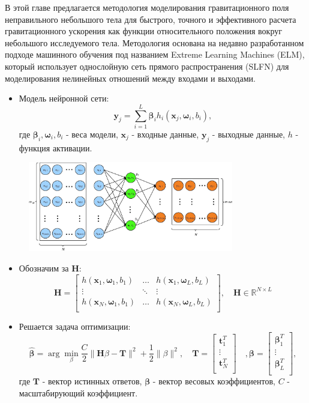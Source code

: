 В этой главе предлагается методология моделирования гравитационного поля неправильного небольшого тела для быстрого, точного и эффективного расчета гравитационного ускорения как функции относительного положения вокруг небольшого исследуемого тела.
Методология основана на недавно разработанном подходе машинного обучения под названием Extreme Learning Machines (ELM), который использует однослойную сеть прямого распространения (SLFN) для моделирования нелинейных отношений между входами и выходами.
\begin{itemize}
\item Модель нейронной сети:
\[
    \mathbf{y}_j = \sum_{i=1}^L \mathbf{\beta}_i
        h_i(\mathbf{x}_j,\mathbf{\omega}_i,{b}_i),
\]
где $\mathbf{\beta}_i,\mathbf{\omega}_i,{b}_i$ - веса модели, $\mathbf{x}_j$ - входные данные, $\mathbf{y}_j$ - выходные данные, $h$ - функция активации.
\end{itemize}
\begin{figure}[h]
    \centering
    \includegraphics[width=0.8\textwidth]{chapters/tikhonov_s2/images/net}
    \label{fg:1}
\end{figure}
\begin{itemize}
\item Обозначим за $\mathbf{H}$:
\[
\mathbf{H} = 
\begin{bmatrix} 
	h(\mathbf{x}_1,\mathbf{\omega}_1,{b}_1) & \ldots & h(\mathbf{x}_1,\mathbf{\omega}_L,{b}_L)\\
	\vdots & \ddots & \vdots \\
	h(\mathbf{x}_N,\mathbf{\omega}_1,{b}_1) & \ldots & h(\mathbf{x}_N,\mathbf{\omega}_L,{b}_L)\\
\end{bmatrix},
\quad
\mathbf{H} \in \mathbb{R}^{N \times L}
\]

\item Решается задача оптимизации:
\[
   \mathbf{\hat{\beta}} = \arg\min_{\beta}\frac{C}{2}\|\mathbf{H}\beta - \mathbf{T}\|^2 + \frac{1}{2}\|\beta\|^2,
   \quad
   \mathbf{T} = 
    \begin{bmatrix} 
    	\mathbf{t}_1^T\\
    	\vdots \\
    	\mathbf{t}_N^T\\
    \end{bmatrix}
   \quad,
   \mathbf{\beta} = 
    \begin{bmatrix} 
    	\mathbf{\beta}_1^T\\
    	\vdots \\
    	\mathbf{\beta}_L^T\\
    \end{bmatrix},
\]
где $\mathbf{T}$ - вектор истинных ответов, $\mathbf{\beta}$ - вектор весовых коэффициентов, $C$ - масштабирующий коэффициент.
\end{itemize}
